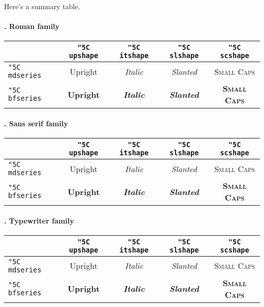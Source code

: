 \documentclass[11pt,a4paper]{article}
\newcommand{\cn}[1]{{\tt \char"5C #1}}
\begin{document}
Here's a summary table.
{

\paragraph{. Roman family}

\rmfamily
\begin{center}\begin{tabular}{l|cccc}
& \cn{upshape} & \cn{itshape} & \cn{slshape} & \cn{scshape} \\
\hline
\cn{mdseries} %
   & \mdseries\upshape Upright %
   & \mdseries\itshape Italic %
   & \mdseries\slshape Slanted %
   & \mdseries\scshape Small Caps \\
\cn{bfseries} %
   & \bfseries\upshape Upright %
   & \bfseries\itshape Italic %
   & \bfseries\slshape Slanted %
   & \bfseries\scshape Small Caps \\
\hline
\end{tabular}\end{center}

\paragraph{. Sans serif family}

\sffamily
\begin{center}\begin{tabular}{l|cccc}
& \cn{upshape} & \cn{itshape} & \cn{slshape} & \cn{scshape} \\
\hline
\cn{mdseries} %
   & \mdseries\upshape Upright %
   & \mdseries\itshape Italic %
   & \mdseries\slshape Slanted %
   & \mdseries\scshape Small Caps \\
\cn{bfseries} %
   & \bfseries\upshape Upright %
   & \bfseries\itshape Italic %
   & \bfseries\slshape Slanted %
   & \bfseries\scshape Small Caps \\
\hline
\end{tabular}\end{center}

\paragraph{. Typewriter family}

\ttfamily
\begin{center}\begin{tabular}{l|cccc}
& \cn{upshape} & \cn{itshape} & \cn{slshape} & \cn{scshape} \\
\hline
\cn{mdseries} %
   & \mdseries\upshape Upright %
   & \mdseries\itshape Italic %
   & \mdseries\slshape Slanted %
   & \mdseries\scshape Small Caps \\
\cn{bfseries} %
   & \bfseries\upshape Upright %
   & \bfseries\itshape Italic %
   & \bfseries\slshape Slanted %
   & \bfseries\scshape Small Caps \\
\hline
\end{tabular}\end{center}

}
\medskip
\end{document}
